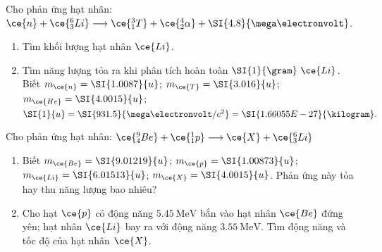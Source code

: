 \begin{ex}
	Cho phản ứng hạt nhân: $\ce{n}+\ce{^6_3Li}\longrightarrow\ce{^3_1T}+\ce{^4_2\alpha}+\SI{4.8}{\mega\electronvolt}$.
	\begin{enumerate}[label=\alph*)]
		\item Tìm khối lượng hạt nhân $\ce{Li}$.
		\item Tìm năng lượng tỏa ra khi phân tích hoàn toàn $\SI{1}{\gram}\ \ce{Li}$. \\
		Biết $m_{\ce{n}}=\SI{1.0087}{u}$; $m_{\ce{T}}=\SI{3.016}{u}$; $m_{\ce{He}}=\SI{4.0015}{u}$; $\SI{1}{u}=\SI{931.5}{\mega\electronvolt/c^2}=\SI{1.66055E-27}{\kilogram}.$
	\end{enumerate}
\end{ex}
\begin{ex}
	Cho phản ứng hạt nhân: $\ce{^9_4Be}+\ce{^1_1p}\longrightarrow\ce{X}+\ce{^6_3Li}$
	\begin{enumerate}[label=\alph*)]
		\item Biết $m_{\ce{Be}}=\SI{9.01219}{u}$; $m_{\ce{p}}=\SI{1.00873}{u}$; $m_{\ce{Li}}=\SI{6.01513}{u}$; $m_{\ce{X}}=\SI{4.0015}{u}$. Phản ứng này tỏa hay thu năng lượng bao nhiêu?
		\item Cho hạt $\ce{p}$ có động năng $\SI{5.45}{\mega\electronvolt}$ bắn vào hạt nhân $\ce{Be}$ đứng yên; hạt nhân $\ce{Li}$ bay ra với động năng $\SI{3.55}{\mega\electronvolt}$. Tìm động năng và tốc độ của hạt nhân $\ce{X}$.
	\end{enumerate}
\end{ex}
